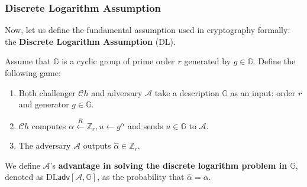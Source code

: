 \documentclass[../lecture-notes.tex]{subfiles}
\begin{document}




\subsubsection{Discrete Logarithm Assumption}

Now, let us define the fundamental assumption used in cryptography formally: the \textbf{Discrete Logarithm Assumption} (DL).

\begin{definition}
    Assume that $\mathbb{G}$ is a cyclic group of prime order $r$ generated by $g \in \mathbb{G}$. Define the following game:
    \begin{enumerate}
        \item Both challenger $\mathcal{C}h$ and adversary $\mathcal{A}$ take a description $\mathbb{G}$ as an input: order $r$ and generator $g \in \mathbb{G}$.
        \item $\mathcal{C}h$ computes $\alpha \xleftarrow{R} \mathbb{Z}_r, u \gets g^{\alpha}$ and sends $u \in \mathbb{G}$ to $\mathcal{A}$.
        \item The adversary $\mathcal{A}$ outputs $\hat{\alpha} \in \mathbb{Z}_r$.
    \end{enumerate}

    We define $\mathcal{A}$'s \textbf{advantage in solving the discrete logarithm problem in $\mathbb{G}$}, denoted as $\text{DL}\mathsf{adv}[\mathcal{A},\mathbb{G}]$, as the probability that $\hat{\alpha} = \alpha$.
\end{definition}
\end{document}
